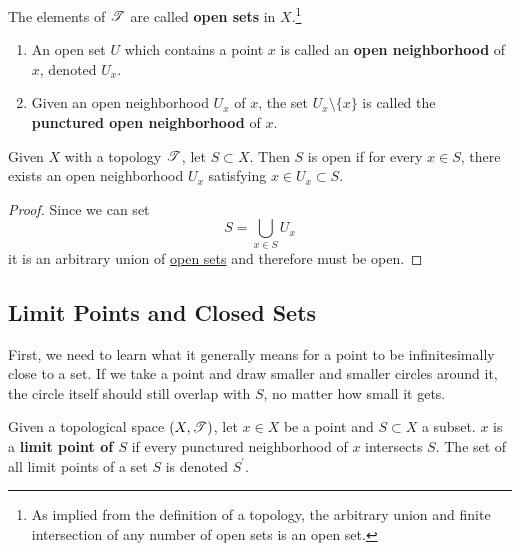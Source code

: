   \begin{definition}
    \label{def:open-set}
    The elements of $\operatorname{\mathscr{T}}$ are called \textbf{open sets} in $X$.\footnote{As implied from the definition of a topology, the arbitrary union and finite intersection of any number of open sets is an open set.} 
    \begin{enumerate}
      \item An open set $U$ which contains a point $x$ is called an \textbf{open neighborhood} of $x$, denoted $U_x$. 
      \item Given an open neighborhood $U_x$ of $x$, the set $U_x \setminus \{x\}$ is called the \textbf{punctured open neighborhood} of $x$. 
    \end{enumerate}
  \end{definition}

  \begin{lemma}
    \label{thm:a-set-full-of-open-sets-is-open}
    Given $X$ with a topology $\operatorname{\mathscr{T}}$, let $S \subset X$. Then $S$ is open if for every $x \in S$, there exists an open neighborhood $U_x$ satisfying $x \in U_x \subset S$. 
  \end{lemma}
  \begin{proof}
    Since we can set 
    \begin{equation}
      S = \bigcup_{x \in S} U_x
    \end{equation}
    it is an arbitrary union of \hyperref[def:open-set]{open sets} and therefore must be open. 
  \end{proof}
 
\subsection{Limit Points and Closed Sets} 

  First, we need to learn what it generally means for a point to be infinitesimally close to a set. If we take a point and draw smaller and smaller circles around it, the circle itself should still overlap with $S$, no matter how small it gets.

  \begin{definition}
    \label{def:limit-point}
    Given a topological space $(X, \operatorname{\mathscr{T}})$, let $x \in X$ be a point and $S \subset X$ a subset. $x$ is a \textbf{limit point of $S$} if every punctured neighborhood of $x$ intersects $S$. The set of all limit points of a set $S$ is denoted $S^\prime$.  
  \end{definition} 

